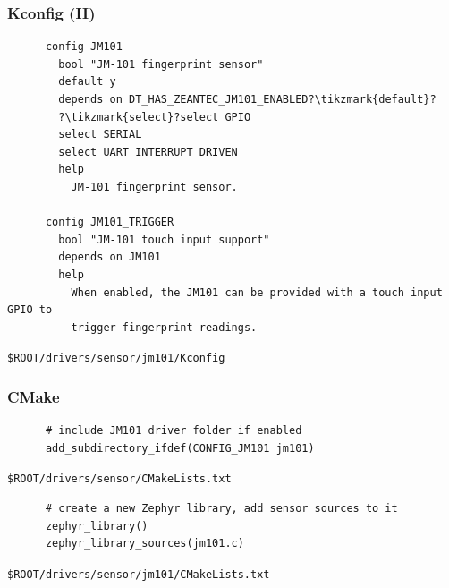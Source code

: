\documentclass[handout]{beamer}
\begin{document}
\begin{frame}[fragile]
  \frametitle{Kconfig (II)}

  \vspace{2.5em}

  \begin{listing}[H]
    \begin{verbatim}
      config JM101
        bool "JM-101 fingerprint sensor"
        default y
        depends on DT_HAS_ZEANTEC_JM101_ENABLED?\tikzmark{default}?
        ?\tikzmark{select}?select GPIO
        select SERIAL
        select UART_INTERRUPT_DRIVEN
        help
          JM-101 fingerprint sensor.

      config JM101_TRIGGER
        bool "JM-101 touch input support"
        depends on JM101
        help
          When enabled, the JM101 can be provided with a touch input GPIO to
          trigger fingerprint readings.
    \end{verbatim}
    \caption{\texttt{\$ROOT/drivers/sensor/jm101/Kconfig}}
  \end{listing}

\end{frame}

\begin{frame}[fragile]
  \frametitle{CMake}

  \begin{listing}[H]
    \begin{verbatim}
      # include JM101 driver folder if enabled
      add_subdirectory_ifdef(CONFIG_JM101 jm101)
    \end{verbatim}
    \caption{\texttt{\$ROOT/drivers/sensor/CMakeLists.txt}}
  \end{listing}

  \begin{listing}[H]
    \begin{verbatim}
      # create a new Zephyr library, add sensor sources to it
      zephyr_library()
      zephyr_library_sources(jm101.c)
    \end{verbatim}
    \caption{\texttt{\$ROOT/drivers/sensor/jm101/CMakeLists.txt}
      \footnotemark}
  \end{listing}

\end{frame}
\end{document}
